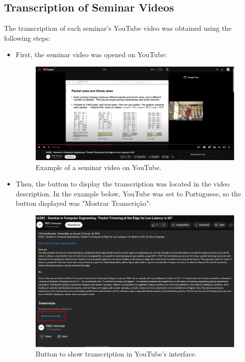 \subsection{Transcription of Seminar Videos}
The transcription of each seminar's YouTube video was obtained using the following steps:
\begin{itemize}
    \item First, the seminar video was opened on YouTube:
    \begin{figure}[H]
        \centering
        \includegraphics[scale=0.35]{Imagens/Youtube Example.png}
        \caption{Example of a seminar video on YouTube.}
    \end{figure}
    \item Then, the button to display the transcription was located in the video description. In the example below, YouTube was set to Portuguese, so the button displayed was "Mostrar Transcrição":
    \begin{figure}[H]
        \centering
        \includegraphics[scale=0.35]{Imagens/show trans.png}
        \caption{Button to show transcription in YouTube's interface.}

\end{figure}
\end{itemize}
